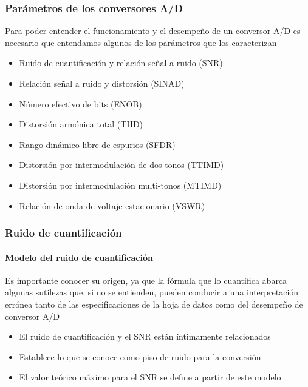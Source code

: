 \documentclass{beamer}
\begin{document}
\begin{frame}
\frametitle{Parámetros de los conversores A/D}
{
\begin{block}{}
Para poder entender el funcionamiento y el desempeño de un conversor A/D es
necesario que entendamos algunos de los parámetros que los caracterizan 
\end{block}
}
\begin{block}{}
\begin{itemize}
\item Ruido de cuantificación y relación señal a ruido (SNR)
\item Relación señal a ruido y distorsión (SINAD)
\item Número efectivo de bits (ENOB)
\item Distorsión armónica total (THD)
\item Rango dinámico libre de espurios (SFDR)
\item Distorsión por intermodulación de dos tonos (TTIMD)
\item Distorsión por intermodulación multi-tonos (MTIMD)
\item Relación de onda de voltaje estacionario (VSWR)
\end{itemize}
\end{block}
\end{frame} 

\begin{frame}
\frametitle{Ruido de cuantificación}
\framesubtitle{Modelo del ruido de cuantificación}
{
\begin{block}{}
Es importante conocer su origen, ya que la fórmula que lo cuantifica abarca
algunas sutilezas que, si no se entienden, pueden conducir a una
\alert{interpretación errónea} tanto de las especificaciones de la hoja de datos como del
desempeño de conversor A/D
\end{block}
}
\begin{block}{}
\begin{itemize}
\item El ruido de cuantificación y el SNR están íntimamente relacionados 
\item Establece lo que se conoce como \alert{piso de ruido} para la
conversión
\item El valor teórico máximo para el SNR se define a partir de este
modelo 
\end{itemize}
\end{block}
\end{frame} 
\end{document}
